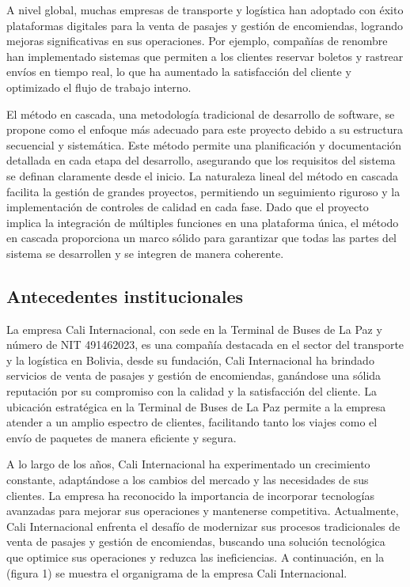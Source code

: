 	A nivel global, muchas empresas de transporte y logística han adoptado con éxito plataformas digitales para la venta de pasajes y gestión de encomiendas, logrando mejoras significativas en sus operaciones. Por ejemplo, compañías de renombre han implementado sistemas que permiten a los clientes reservar boletos y rastrear envíos en tiempo real, lo que ha aumentado la satisfacción del cliente y optimizado el flujo de trabajo interno.
	
	El método en cascada, una metodología tradicional de desarrollo de software, se propone como el enfoque más adecuado para este proyecto debido a su estructura secuencial y sistemática. Este método permite una planificación y documentación detallada en cada etapa del desarrollo, asegurando que los requisitos del sistema se definan claramente desde el inicio. La naturaleza lineal del método en cascada facilita la gestión de grandes proyectos, permitiendo un seguimiento riguroso y la implementación de controles de calidad en cada fase. Dado que el proyecto implica la integración de múltiples funciones en una plataforma única, el método en cascada proporciona un marco sólido para garantizar que todas las partes del sistema se desarrollen y se integren de manera coherente.
	
	\subsection{Antecedentes institucionales}
	
	La empresa Cali Internacional, con sede en la Terminal de Buses de La Paz y número de NIT 491462023, es una compañía destacada en el sector del transporte y la logística en Bolivia, desde su fundación, Cali Internacional ha brindado servicios de venta de pasajes y gestión de encomiendas, ganándose una sólida reputación por su compromiso con la calidad y la satisfacción del cliente. La ubicación estratégica en la Terminal de Buses de La Paz permite a la empresa atender a un amplio espectro de clientes, facilitando tanto los viajes como el envío de paquetes de manera eficiente y segura.
	
	A lo largo de los años, Cali Internacional ha experimentado un crecimiento constante, adaptándose a los cambios del mercado y las necesidades de sus clientes. La empresa ha reconocido la importancia de incorporar tecnologías avanzadas para mejorar sus operaciones y mantenerse competitiva. Actualmente, Cali Internacional enfrenta el desafío de modernizar sus procesos tradicionales de venta de pasajes y gestión de encomiendas, buscando una solución tecnológica que optimice sus operaciones y reduzca las ineficiencias. A continuación, en la (figura 1) se muestra el organigrama de la empresa Cali Internacional.
	
